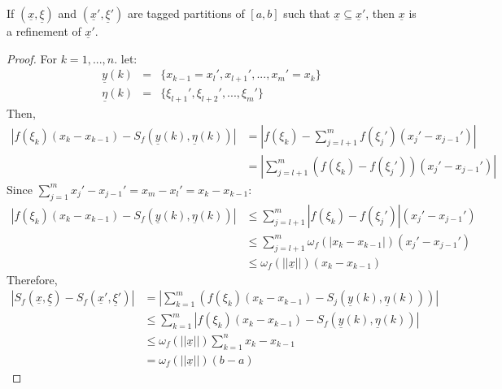 \begin{definition}[Refinement]
    If $(\underline{x}, \underline{\xi})$ and $(\underline{x}', \underline{\xi}')$ are tagged partitions of $[a,b]$ such that $\underline{x} \subseteq \underline{x}'$, then $\underline{x}$ is a refinement of $\underline{x}'$.
\end{definition}

\begin{proof}
    For $k = 1, ..., n$. let:
    \begin{eqnarray*}
        \underline{y}(k) &=& \{ x_{k-1} = x_l', x_{l+1}', ..., x_m' = x_k\} \\
        \underline{\eta}(k) &=& \{ \xi_{l+1}', \xi_{l+2}', ..., \xi_{m}'\}
    \end{eqnarray*}
    Then,
    \begin{align*}
        |f(\xi_k)(x_k - x_{k-1}) - S_f(\underline{y}(k), \underline{\eta}(k))| &= \left |
            f(\xi_k) - \sum \limits_{j=l+1}^m f(\xi_j')(x_j' -x_{j-1}') 
        \right | \\
        &= 
        \left |
            \sum \limits_{j=l+1}^m (f(\xi_k) - f(\xi_j'))(x_j' -x_{j-1}') 
        \right |
    \end{align*}
    Since $\sum_{j=1}^m x_j' - x_{j-1}' = x_m - x_l' = x_k - x_{k-1}$:
    \begin{align*}
        |f(\xi_k)(x_k - x_{k-1}) - S_f(\underline{y}(k), \underline{\eta}(k))| &\leq \sum \limits_{j=l+1}^m |f(\xi_k) - f(\xi_j')|(x_j' - x_{j-1}') \\
        &\leq \sum \limits_{j=l+1}^m \omega_f(|x_k - x_{k-1}|)(x_j' - x_{j-1}') \\
        &\leq \omega_f(||\underline{x}||)(x_k - x_{k-1})
    \end{align*}
    Therefore,
    \begin{align*}
        |S_f(\underline{x}, \underline{\xi}) - S_f(\underline{x}', \underline{\xi}')| &= 
        \left |
            \sum \limits_{k=1}^m (f(\xi_k)(x_k - x_{k-1}) - S_j(\underline{y}(k), \underline{\eta}(k)))
        \right | \\
        & \leq
        \sum \limits_{k=1}^m |f(\xi_k)(x_k - x_{k-1}) - S_f(\underline{y}(k), \underline{\eta}(k))| \\
        & \leq \omega_f(||\underline{x}||)\sum \limits_{k=1}^n x_k - x_{k-1} \\
        &= \omega_f(||\underline{x}||)(b-a)
    \end{align*}
\end{proof}

